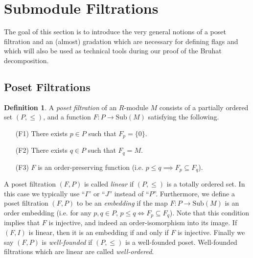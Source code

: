 \documentclass[oneside,11pt]{amsart}
\newcommand{\Sub}{\ensuremath{\text{Sub}}}
\theoremstyle{definition}
\newtheorem{definition}{Definition}
\newtheorem{proof techniques}{Proof Techniques}
\begin{document}
\section{Submodule Filtrations} \label{sec: submodule filtrations}



The goal of this section is to introduce the very general notions of a poset filtration and an (almost) gradation which are necessary for defining flags and which will also be used as technical tools during our proof of the Bruhat decomposition.


\subsection{Poset Filtrations}

\begin{definition}
A \emph{poset filtration} of an $R$-module $M$ consists of a partially ordered set $(P , \leq )$, and a function $F: P \to \Sub(M)$ satisfying the following.

\begin{enumerate}

\item[(F1)] There exists $p \in P$ such that $F_p = \{ 0 \}$. 

\item[(F2)] There exists $q \in P$ such that $F_q = M$. 

\item[(F3)] $F$ is an order-preserving function (i.e. $p \leq q \implies F_p \subseteq F_q$).  

\end{enumerate}
\end{definition}

A poset filtration $(F , P)$ is called \emph{linear} if $(P , \leq)$ is a totally ordered set. In this case we typically use ``$I$'' or ``$J$'' instead of ``$P$''. Furthermore, we define a poset filtration $(F , P)$ to be an \emph{embedding} if the map $F: P \to \Sub(M)$ is an order embedding (i.e. for any $p , q \in P$, $p \leq q \iff F_p \subseteq F_q$). Note that this condition implies that $F$ is injective, and indeed an order-isomorphism into its image. If $(F , I)$ is linear, then it is an embedding if and only if $F$ is injective. Finally we say $(F , P)$ is \emph{well-founded} if $(P , \leq)$ is a well-founded poset. Well-founded filtrations which are linear are called \emph{well-ordered}. 
\end{document}
